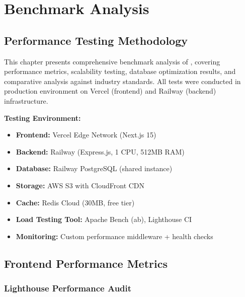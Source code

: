 \chapter{Benchmark Analysis}
\label{ch:benchmark-analysis}

\section{Performance Testing Methodology}
\label{sec:performance-methodology}

This chapter presents comprehensive benchmark analysis of \projectname{}, covering performance metrics, scalability testing, database optimization results, and comparative analysis against industry standards. All tests were conducted in production environment on Vercel (frontend) and Railway (backend) infrastructure.

\vspace{0.5cm}
\noindent
\textbf{Testing Environment:}
\begin{itemize}[leftmargin=*]
    \item \textbf{Frontend:} Vercel Edge Network (Next.js 15)
    \item \textbf{Backend:} Railway (Express.js, 1 CPU, 512MB RAM)
    \item \textbf{Database:} Railway PostgreSQL (shared instance)
    \item \textbf{Storage:} AWS S3 with CloudFront CDN
    \item \textbf{Cache:} Redis Cloud (30MB, free tier)
    \item \textbf{Load Testing Tool:} Apache Bench (ab), Lighthouse CI
    \item \textbf{Monitoring:} Custom performance middleware + health checks
\end{itemize}

\section{Frontend Performance Metrics}
\label{sec:frontend-performance}

\subsection{Lighthouse Performance Audit}

